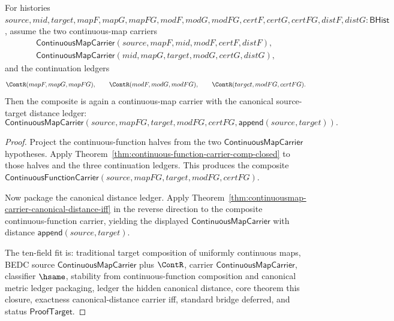 \begin{theorem}
\label{thm:continuousmap-carrier-comp-closed}
For histories
$source,mid,target,mapF,mapG,mapFG,modF,modG,modFG,certF,certG,certFG,distF,distG:\mathsf{BHist}$,
assume the two continuous-map carriers
$$
\begin{array}{l}
\mathsf{ContinuousMapCarrier}(source,mapF,mid,modF,certF,distF),\\
\mathsf{ContinuousMapCarrier}(mid,mapG,target,modG,certG,distG),
\end{array}
$$
and the continuation ledgers
$$
\ContR(mapF,mapG,mapFG),\qquad
\ContR(modF,modG,modFG),\qquad
\ContR(target,modFG,certFG).
$$
Then the composite is again a continuous-map carrier with the canonical
source-target distance ledger:
$$
\mathsf{ContinuousMapCarrier}
(source,mapFG,target,modFG,certFG,\mathsf{append}(source,target)).
$$
\end{theorem}
\begin{proof}
Project the continuous-function halves from the two
$\mathsf{ContinuousMapCarrier}$ hypotheses. Apply
Theorem~\ref{thm:continuous-function-carrier-comp-closed} to those halves and
the three continuation ledgers. This produces the composite
$\mathsf{ContinuousFunctionCarrier}(source,mapFG,target,modFG,certFG)$.

Now package the canonical distance ledger. Apply
Theorem~\ref{thm:continuousmap-carrier-canonical-distance-iff} in the reverse
direction to the composite continuous-function carrier, yielding the displayed
$\mathsf{ContinuousMapCarrier}$ with distance
$\mathsf{append}(source,target)$.

The ten-field fit is: traditional target composition of uniformly continuous
maps, BEDC source $\mathsf{ContinuousMapCarrier}$ plus $\ContR$, carrier
$\mathsf{ContinuousMapCarrier}$, classifier $\hsame$, stability from
continuous-function composition and canonical metric ledger packaging, ledger
the hidden canonical distance, core theorem this closure, exactness
canonical-distance carrier iff, standard bridge deferred, and status
$\mathsf{ProofTarget}$.
\end{proof}

